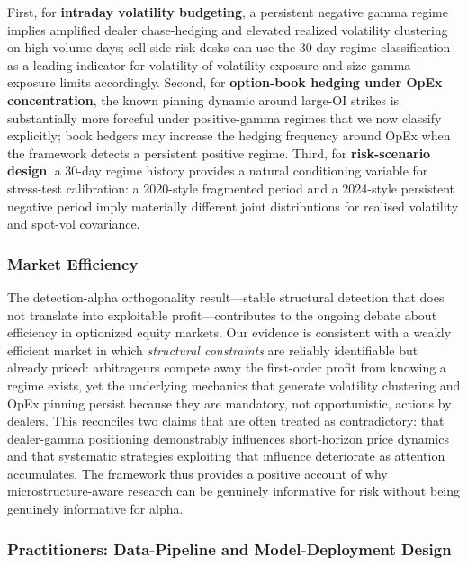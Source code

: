 \documentclass[jrfm,article,accept,moreauthors,pdftex]{Definitions/mdpi}
\begin{document}
First, for \textbf{intraday volatility budgeting}, a persistent negative
gamma regime implies amplified dealer chase-hedging and elevated realized
volatility clustering on high-volume days; sell-side risk desks can use
the 30-day regime classification as a leading indicator for
volatility-of-volatility exposure and size gamma-exposure limits
accordingly. Second, for \textbf{option-book hedging under OpEx
concentration}, the known pinning dynamic around large-OI strikes
\citep{ni2005stock} is substantially more forceful under positive-gamma
regimes that we now classify explicitly; book hedgers may increase the
hedging frequency around OpEx when the framework detects a persistent
positive regime. Third, for \textbf{risk-scenario design}, a 30-day
regime history provides a natural conditioning variable for stress-test
calibration: a 2020-style fragmented period and a 2024-style persistent
negative period imply materially different joint distributions for
realised volatility and spot-vol covariance.

\subsubsection{Market Efficiency}

The detection-alpha orthogonality result---stable structural detection
that does not translate into exploitable profit---contributes to the
ongoing debate about efficiency in optionized equity markets. Our
evidence is consistent with a weakly efficient market in which
\textit{structural constraints} are reliably identifiable but already
priced: arbitrageurs compete away the first-order profit from knowing a
regime exists, yet the underlying mechanics that generate volatility
clustering and OpEx pinning persist because they are mandatory, not
opportunistic, actions by dealers. This reconciles two claims that are
often treated as contradictory: that dealer-gamma positioning demonstrably
influences short-horizon price dynamics \citep{anderegg2022impact} and
that systematic strategies exploiting that influence deteriorate as
attention accumulates. The framework thus provides a positive account of
why microstructure-aware research can be genuinely informative for risk
without being genuinely informative for alpha.

\subsubsection{Practitioners: Data-Pipeline and Model-Deployment Design}
\end{document}
